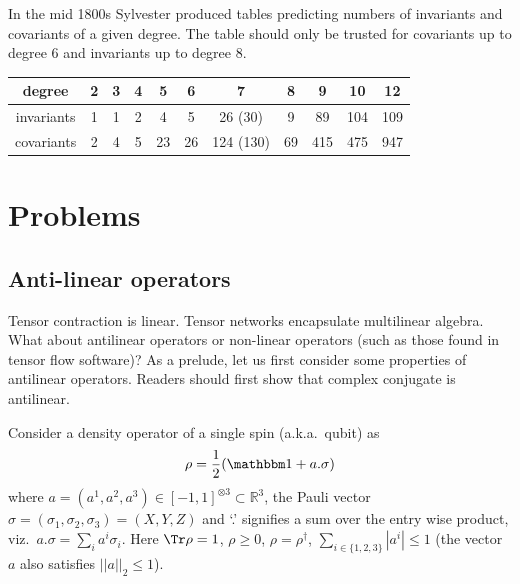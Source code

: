 \begin{remark}
In the mid 1800s Sylvester produced tables predicting numbers of invariants and covariants of a given degree.  The table should only be trusted for covariants up to degree 6 and invariants up to degree 8.  
 \begin{center}
\begin{tabular}{c||cccccccccc}
\hline
degree     & 2 & 3 & 4 & 5 & 6 & 7 & 8 & 9 & 10 & 12 \\\hline \hline 
invariants & 1 & 1 & 2 & 4 & 5 & 26 (30) & 9 & 89 & 104 & 109 \\
covariants & 2 & 4 & 5 & 23 & 26 & 124 (130) & 69 & 415 & 475 & 947 \\\hline 
\end{tabular}
\end{center}
\end{remark}

\section{Problems} 

\subsection*{Anti-linear operators} 

\begin{remark}
Tensor contraction is linear.  Tensor networks encapsulate multilinear algebra.  What about antilinear operators or non-linear operators (such as those found in tensor flow software)?  As a prelude, let us first consider some properties of antilinear operators.  Readers should first show that complex conjugate is antilinear. 
\end{remark}

\begin{definition}
Consider a density operator of a single spin (a.k.a.~qubit) as
\begin{equation}
\rho = \frac{1}{2}(\I + a.\sigma)
\end{equation}
where $a=(a^1, a^2, a^3)\in [-1,1]^{\otimes 3}\subset \mathbb{R}^3$, the Pauli vector $\sigma=(\sigma_1, \sigma_2, \sigma_3) = (X, Y, Z)$ and `.' signifies a sum over the entry wise product, viz.~$a.\sigma = \sum_i a^i \sigma_i$.  Here $\Tr \rho = 1$, $\rho \geq 0$, $\rho=\rho^\dagger$, $\sum_{i\in\{1,2,3\}} |a^i|\leq 1$ (the vector $a$ also satisfies $||a||_2\leq 1$). 
\end{definition}
  
